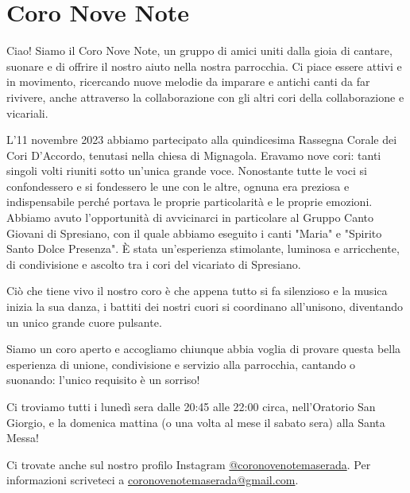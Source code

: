 \section{Coro Nove Note}

Ciao! Siamo il Coro Nove Note, un gruppo di amici uniti dalla gioia di cantare, suonare e di offrire il nostro aiuto nella nostra parrocchia. Ci piace essere attivi e in movimento, ricercando nuove melodie da imparare e antichi canti da far rivivere, anche attraverso la collaborazione con gli altri cori della collaborazione e vicariali.

L'11 novembre 2023 abbiamo partecipato alla quindicesima Rassegna Corale dei Cori D'Accordo, tenutasi nella chiesa di Mignagola. Eravamo nove cori: tanti singoli volti riuniti sotto un'unica grande voce. Nonostante tutte le voci si confondessero e si fondessero le une con le altre, ognuna era preziosa e indispensabile perché portava le proprie particolarità e le proprie emozioni. Abbiamo avuto l'opportunità di avvicinarci in particolare al Gruppo Canto Giovani di Spresiano, con il quale abbiamo eseguito i canti "Maria" e "Spirito Santo Dolce Presenza".
È stata un'esperienza stimolante, luminosa e arricchente, di condivisione e ascolto tra i cori del vicariato di Spresiano. 

Ciò che tiene vivo il nostro coro è che appena tutto si fa silenzioso e la musica inizia la sua danza, i battiti dei nostri cuori si coordinano all'unisono, diventando un unico grande cuore pulsante.

Siamo un coro aperto e accogliamo chiunque abbia voglia di provare questa bella esperienza di unione, condivisione e servizio alla parrocchia, cantando o suonando: l'unico requisito è un sorriso!

Ci troviamo tutti i lunedì sera dalle 20:45 alle 22:00 circa, nell'Oratorio San Giorgio, e la domenica mattina (o una volta al mese il sabato sera) alla Santa Messa!

Ci trovate anche sul nostro profilo Instagram \url{@coronovenotemaserada}. Per informazioni scriveteci a \url{coronovenotemaserada@gmail.com}.


